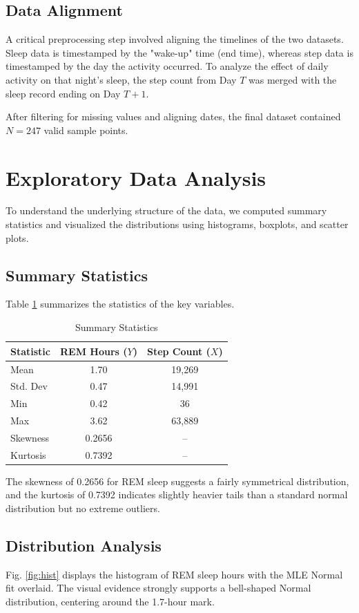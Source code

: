 \documentclass[conference]{IEEEtran}
\begin{document}
\subsection{Data Alignment}
A critical preprocessing step involved aligning the timelines of the two datasets. Sleep data is timestamped by the "wake-up" time (end time), whereas step data is timestamped by the day the activity occurred. To analyze the effect of daily activity on that night's sleep, the step count from Day $T$ was merged with the sleep record ending on Day $T+1$.

After filtering for missing values and aligning dates, the final dataset contained $N=247$ valid sample points.

\section{Exploratory Data Analysis}
To understand the underlying structure of the data, we computed summary statistics and visualized the distributions using histograms, boxplots, and scatter plots.

\subsection{Summary Statistics}
Table \ref{tab:stats} summarizes the statistics of the key variables.

\begin{table}[H]
\centering
\caption{Summary Statistics}
\label{tab:stats}
\begin{tabular}{@{}lcc@{}}
\toprule
Statistic & REM Hours ($Y$) & Step Count ($X$) \\ \midrule
Mean & 1.70 & 19,269 \\
Std. Dev & 0.47 & 14,991 \\
Min & 0.42 & 36 \\
Max & 3.62 & 63,889 \\
Skewness & 0.2656 & -- \\
Kurtosis & 0.7392 & -- \\ \bottomrule
\end{tabular}
\end{table}

The skewness of 0.2656 for REM sleep suggests a fairly symmetrical distribution, and the kurtosis of 0.7392 indicates slightly heavier tails than a standard normal distribution but no extreme outliers.

\subsection{Distribution Analysis}
Fig. \ref{fig:hist} displays the histogram of REM sleep hours with the MLE Normal fit overlaid. The visual evidence strongly supports a bell-shaped Normal distribution, centering around the 1.7-hour mark.
\end{document}
